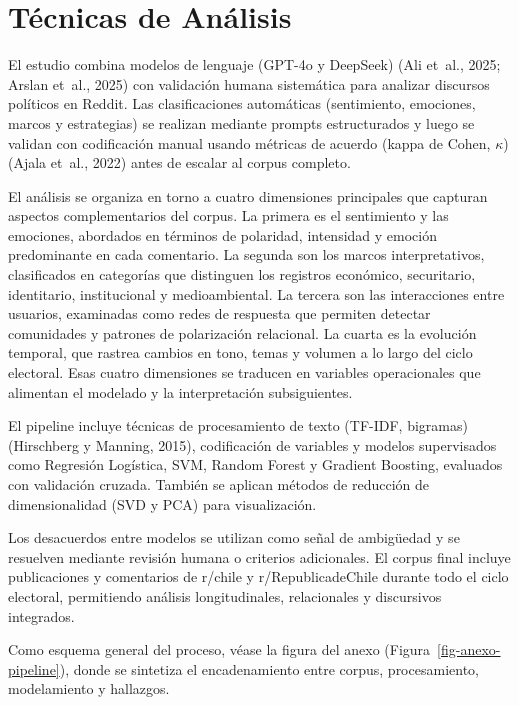 \documentclass[
  letterpaper,
  numbers=noendperiod,
  fontsize=11pt,
  DIV=12,
  titlepage=false]{scrreprt}
\begin{document}
\section{Técnicas de Análisis}\label{tuxe9cnicas-de-anuxe1lisis}

El estudio combina modelos de lenguaje (GPT-4o y DeepSeek) (Ali et~al.,
2025; Arslan et~al., 2025) con validación humana sistemática para
analizar discursos políticos en Reddit. Las clasificaciones automáticas
(sentimiento, emociones, marcos y estrategias) se realizan mediante
prompts estructurados y luego se validan con codificación manual usando
métricas de acuerdo (kappa de Cohen, \(\kappa\)) (Ajala et~al., 2022)
antes de escalar al corpus completo.

El análisis se organiza en torno a cuatro dimensiones principales que
capturan aspectos complementarios del corpus. La primera es el
sentimiento y las emociones, abordados en términos de polaridad,
intensidad y emoción predominante en cada comentario. La segunda son los
marcos interpretativos, clasificados en categorías que distinguen los
registros económico, securitario, identitario, institucional y
medioambiental. La tercera son las interacciones entre usuarios,
examinadas como redes de respuesta que permiten detectar comunidades y
patrones de polarización relacional. La cuarta es la evolución temporal,
que rastrea cambios en tono, temas y volumen a lo largo del ciclo
electoral. Esas cuatro dimensiones se traducen en variables
operacionales que alimentan el modelado y la interpretación
subsiguientes.

El pipeline incluye técnicas de procesamiento de texto (TF-IDF,
bigramas) (Hirschberg y Manning, 2015), codificación de variables y
modelos supervisados como Regresión Logística, SVM, Random Forest y
Gradient Boosting, evaluados con validación cruzada. También se aplican
métodos de reducción de dimensionalidad (SVD y PCA) para visualización.

Los desacuerdos entre modelos se utilizan como señal de ambigüedad y se
resuelven mediante revisión humana o criterios adicionales. El corpus
final incluye publicaciones y comentarios de r/chile y
r/RepublicadeChile durante todo el ciclo electoral, permitiendo análisis
longitudinales, relacionales y discursivos integrados.

Como esquema general del proceso, véase la figura del anexo
(Figura~\ref{fig-anexo-pipeline}), donde se sintetiza el encadenamiento
entre corpus, procesamiento, modelamiento y hallazgos.

\end{document}
